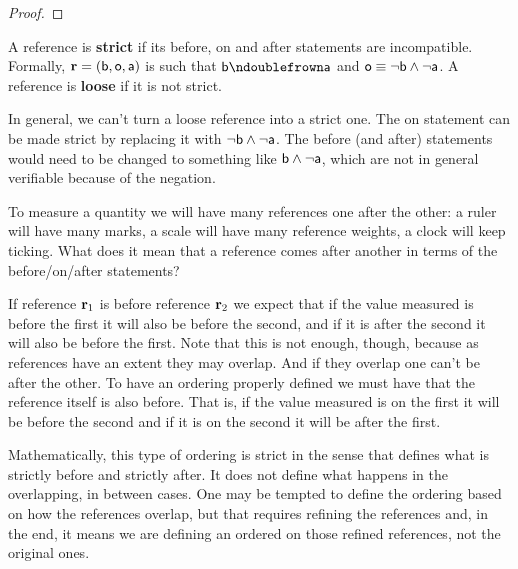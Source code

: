 \documentclass[11pt,letterpaper,fleqn]{memoir} %
\begin{document}
\begin{mathSection}
\begin{proof}
\end{proof}
\begin{defn}
	A reference is \textbf{strict} if its before, on and after statements are incompatible. Formally, $\refStmt = (\stmt[b], \stmt[o], \stmt[a])$ is such that $\stmt[b] \ncomp \stmt[a]$ and $\stmt[o] \equiv \NOT \stmt[b] \AND \NOT \stmt[a]$. A reference is \textbf{loose} if it is not strict.
\end{defn}
\begin{remark}
	In general, we can't turn a loose reference into a strict one. The on statement can be made strict by replacing it with $\NOT \stmt[b] \AND \NOT \stmt[a]$. The before (and after) statements would need to be changed to something like $\stmt[b] \AND \NOT \stmt[a]$, which are not in general verifiable because of the negation.
\end{remark}
\end{mathSection}

To measure a quantity we will have many references one after the other: a ruler will have many marks, a scale will have many reference weights, a clock will keep ticking. What does it mean that a reference comes after another in terms of the before/on/after statements?

If reference $\refStmt_1$ is before reference $\refStmt_2$ we expect that if the value measured is before the first it will also be before the second, and if it is after the second it will also be before the first. Note that this is not enough, though, because as references have an extent they may overlap. And if they overlap one can't be after the other. To have an ordering properly defined we must have that the reference itself is also before. That is, if the value measured is on the first it will be before the second and if it is on the second it will be after the first.

Mathematically, this type of ordering is strict in the sense that defines what is strictly before and strictly after. It does not define what happens in the overlapping, in between cases. One may be tempted to define the ordering based on how the references overlap, but that requires refining the references and, in the end, it means we are defining an ordered on those refined references, not the original ones.
\end{document}
